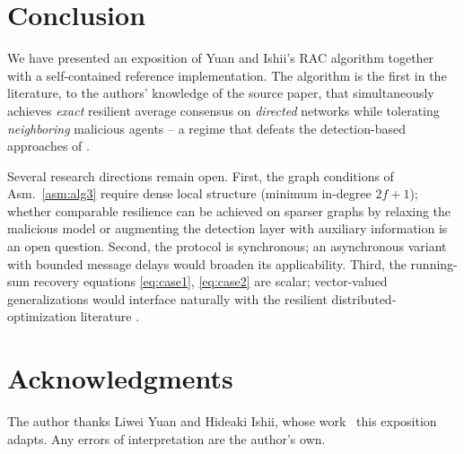 \documentclass[journal]{IEEEtran}
\begin{document}
\section{Conclusion}
\label{sec:conclusion}

We have presented an exposition of Yuan and Ishii's RAC algorithm
\cite{yuan2024resilient} together with a self-contained reference
implementation.  The algorithm is the first in the literature, to the
authors' knowledge of the source paper, that simultaneously achieves
\emph{exact} resilient average consensus on \emph{directed} networks while
tolerating \emph{neighboring} malicious agents -- a regime that defeats the
detection-based approaches of
\cite{zheng2021accurate,hadjicostis2023trustworthy,hadjicostis2023identification}.

Several research directions remain open.  First, the graph conditions of
Asm.~\ref{asm:alg3} require dense local structure (minimum in-degree
$2f\!+\!1$); whether comparable resilience can be achieved on sparser
graphs by relaxing the malicious model or augmenting the detection layer
with auxiliary information is an open question.  Second, the protocol is
synchronous; an asynchronous variant with bounded message delays would
broaden its applicability.  Third, the running-sum recovery equations
\eqref{eq:case1}, \eqref{eq:case2} are scalar; vector-valued generalizations
would interface naturally with the resilient distributed-optimization
literature \cite{zhu2023resilient,gupta2021byzantine}.

\section*{Acknowledgments}
The author thanks Liwei Yuan and Hideaki Ishii, whose work~\cite{yuan2024resilient}
this exposition adapts.  Any errors of interpretation are the author's own.
\end{document}
